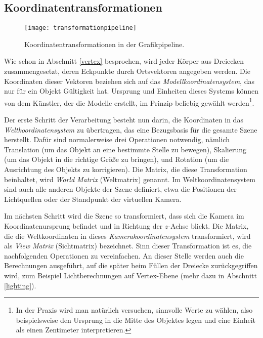
\subsection{Koordinatentransformationen}
\label{coordinatesystems}

\begin{wrapfigure}{R}{0.3\textwidth}
  \texttt{[image: transformationpipeline]}
  \vspace{-10pt}
  \caption{Koordinatentransformationen in der Grafikpipeline.}
\end{wrapfigure}

Wie schon in Abschnitt \ref{vertex} besprochen, wird jeder Körper aus Dreiecken zusammengesetzt, deren Eckpunkte durch Ortsvektoren angegeben werden. Die Koordinaten dieser Vektoren beziehen sich auf das \emph{Modellkoordinatensystem}, das nur für ein Objekt Gültigkeit hat. Ursprung und Einheiten dieses Systems können von dem Künstler, der die Modelle erstellt, im Prinzip beliebig gewählt werden\footnote{In der Praxis wird man natürlich versuchen, sinnvolle Werte zu wählen, also beispielsweise den Ursprung in die Mitte des Objektes legen und eine Einheit als einen Zentimeter interpretieren.}.

Der erste Schritt der Verarbeitung besteht nun darin, die Koordinaten in das \emph{Weltkoordinatensystem} zu übertragen, das eine Bezugsbasis für die gesamte Szene herstellt. Dafür sind normalerweise drei Operationen notwendig, nämlich Translation (um das Objekt an eine bestimmte Stelle zu bewegen), Skalierung (um das Objekt in die richtige Größe zu bringen), und Rotation (um die Ausrichtung des Objekts zu korrigieren). Die Matrix, die diese Transformation beinhaltet, wird \emph{World Matrix} (Weltmatrix) genannt. Im Weltkoordinatensystem sind auch alle anderen Objekte der Szene definiert, etwa die Positionen der Lichtquellen oder der Standpunkt der virtuellen Kamera.

Im nächsten Schritt wird die Szene so transformiert, dass sich die Kamera im Koordinatenursprung befindet und in Richtung der $z$-Achse blickt. Die Matrix, die die Weltkoordinaten in dieses \emph{Kamerakoordinatensystem} transformiert, wird als \emph{View Matrix} (Sichtmatrix) bezeichnet. Sinn dieser Transformation ist es, die nachfolgenden Operationen zu vereinfachen. An dieser Stelle werden auch die Berechnungen ausgeführt, auf die später beim Füllen der Dreiecke zurückgegriffen wird, zum Beispiel Lichtberechnungen auf Vertex-Ebene (mehr dazu in Abschnitt \ref{lighting}).

